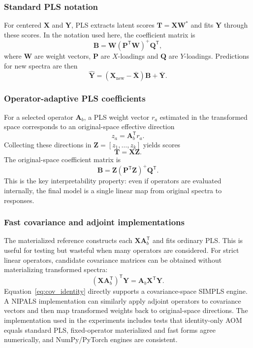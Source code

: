 \documentclass[11pt,a4paper]{article}
\newcommand{\X}{\mathbf{X}}
\newcommand{\Y}{\mathbf{Y}}
\newcommand{\A}{\mathbf{A}}
\newcommand{\B}{\mathbf{B}}
\newcommand{\Z}{\mathbf{Z}}
\newcommand{\T}{\mathbf{T}}
\newcommand{\transpose}{^{\mathsf T}}
\begin{document}
\subsubsection{Standard PLS notation}

For centered $\X$ and $\Y$, PLS extracts latent scores $\T=\X\mathbf W^*$ and
fits $\Y$ through these scores.  In the notation used here, the coefficient
matrix is
\begin{equation}
  \B = \mathbf W(\mathbf P\transpose \mathbf W)^+ \mathbf Q\transpose ,
\end{equation}
where $\mathbf W$ are weight vectors, $\mathbf P$ are $X$-loadings and
$\mathbf Q$ are $Y$-loadings.  Predictions for new spectra are then
\begin{equation}
  \widehat{\Y} = (\X_{\mathrm{new}}-\bar{\X})\B + \bar{\Y}.
\end{equation}

\subsubsection{Operator-adaptive PLS coefficients}

For a selected operator $\A_b$, a PLS weight vector $r_a$ estimated in the
transformed space corresponds to an original-space effective direction
\begin{equation}
  z_a = \A_b\transpose r_a .
\end{equation}
Collecting these directions in $\Z=[z_1,\ldots,z_k]$ yields scores
\begin{equation}
  \T = \X\Z .
\end{equation}
The original-space coefficient matrix is
\begin{equation}
  \B = \Z(\mathbf P\transpose \Z)^+ \mathbf Q\transpose .
  \label{eq:aompls_coef}
\end{equation}
This is the key interpretability property: even if operators are evaluated
internally, the final model is a single linear map from original spectra to
responses.

\subsubsection{Fast covariance and adjoint implementations}

The materialized reference constructs each $\X\A_b\transpose$ and fits ordinary
PLS.  This is useful for testing but wasteful when many operators are
considered.  For strict linear operators, candidate covariance matrices can be
obtained without materializing transformed spectra:
\begin{equation}
  (\X\A_b\transpose)\transpose\Y = \A_b\X\transpose\Y .
  \label{eq:cov_identity}
\end{equation}
Equation~\ref{eq:cov_identity} directly supports a covariance-space SIMPLS
engine.  A NIPALS implementation can similarly apply adjoint operators to
covariance vectors and then map transformed weights back to original-space
directions.  The implementation used in the experiments includes tests that
identity-only AOM equals standard PLS, fixed-operator materialized and fast
forms agree numerically, and NumPy/PyTorch engines are consistent.
\end{document}
